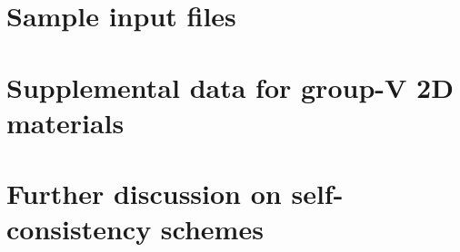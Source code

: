 \documentclass[twoside,12pt]{report}
\begin{document}
\chapter{Sample input files}
\label{ch:input_files}


\chapter[Supplemental data for group-V 2D materials]{Supplemental data for \break group-V 2D materials}
\label{ch:2d_appendix}


%
%
%

\chapter{Further discussion on self-consistency schemes}
\label{ch:self_consistency_appendix}



\newpage

\end{document}
